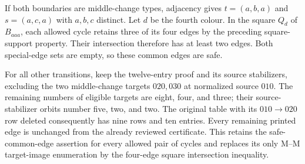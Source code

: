 If both boundaries are middle-change types, adjacency gives
$t=(a,b,a)$ and $s=(a,c,a)$ with $a,b,c$ distinct. Let $d$ be the
fourth colour. In the square $Q_d$ of $B_{aaa}$, each allowed cycle
retains three of its four edges by the preceding square-support
property. Their intersection therefore has at least two edges.
Both special-edge sets are empty, so these common edges are safe.

For all other transitions, keep the twelve-entry proof and its
source stabilizers, excluding the two middle-change targets
$020,030$ at normalized source $010$. The remaining numbers of
eligible targets are eight, four, and three; their source-stabilizer
orbits number five, two, and two. The original table with its
$010\to020$ row deleted consequently has nine rows and ten entries.
Every remaining printed edge is unchanged from the already reviewed
certificate. This retains the safe-common-edge assertion for every
allowed pair of cycles and replaces its only M--M target-image
enumeration by the four-edge square intersection inequality.
